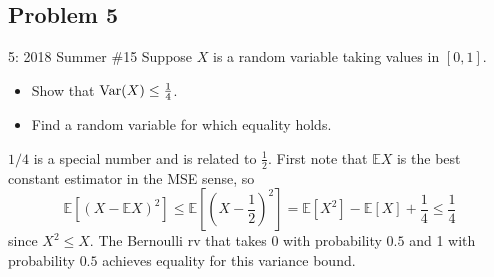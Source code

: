 \documentclass[../main]{subfiles}
\begin{document}
\subsection{Problem 5}
\begin{bbox}{5: 2018 Summer \#15}
    Suppose $X$ is a random variable taking values in $[0,1]$. \begin{itemize}
        \item Show that $\text{Var}(X)\le \frac{1}{4}$.
        \item Find a random variable for which equality holds.
    \end{itemize}
\end{bbox}
\begin{solution}
    $1/4$ is a special number and is related to $\frac{1}{2}$. First note that $\mathbb EX$ is the best constant estimator in the MSE sense, so 
    \[
    \mathbb E[(X-\mathbb EX)^2] \le \mathbb E[(X-\frac{1}{2})^2]=\mathbb E[X^2]-\mathbb E[X] + \frac{1}{4} \le \frac{1}{4}
    \]
    since $X^2 \le X$. The Bernoulli rv that takes 0 with probability $0.5$ and 1 with probability $0.5$ achieves equality for this variance bound.
\end{solution}
\end{document}
